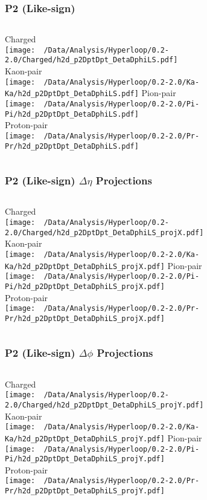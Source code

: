 \documentclass{beamer}
\begin{document}
\begin{frame}
	\frametitle{P2 (Like-sign)}
	\begin{columns}
		\centering
		Charged\\
		\texttt{[image: ~/Data/Analysis/Hyperloop/0.2-2.0/Charged/h2d\_p2DptDpt\_DetaDphiLS.pdf]}\\Kaon-pair\\
		\texttt{[image: ~/Data/Analysis/Hyperloop/0.2-2.0/Ka-Ka/h2d\_p2DptDpt\_DetaDphiLS.pdf]}
		\centering
		Pion-pair\\
		\texttt{[image: ~/Data/Analysis/Hyperloop/0.2-2.0/Pi-Pi/h2d\_p2DptDpt\_DetaDphiLS.pdf]}\\Proton-pair\\
		\texttt{[image: ~/Data/Analysis/Hyperloop/0.2-2.0/Pr-Pr/h2d\_p2DptDpt\_DetaDphiLS.pdf]}
	\end{columns}
\end{frame}
\begin{frame}
	\frametitle{P2 (Like-sign) $\Delta\eta$ Projections}
	\begin{columns}
		\column{0.5\textwidth}
		\centering
		Charged\\
		\texttt{[image: ~/Data/Analysis/Hyperloop/0.2-2.0/Charged/h2d\_p2DptDpt\_DetaDphiLS\_projX.pdf]}\\Kaon-pair\\
		\texttt{[image: ~/Data/Analysis/Hyperloop/0.2-2.0/Ka-Ka/h2d\_p2DptDpt\_DetaDphiLS\_projX.pdf]}
		\column{0.5\textwidth}
		\centering
		Pion-pair\\
		\texttt{[image: ~/Data/Analysis/Hyperloop/0.2-2.0/Pi-Pi/h2d\_p2DptDpt\_DetaDphiLS\_projX.pdf]}\\Proton-pair\\
		\texttt{[image: ~/Data/Analysis/Hyperloop/0.2-2.0/Pr-Pr/h2d\_p2DptDpt\_DetaDphiLS\_projX.pdf]}
	\end{columns}
\end{frame}
\begin{frame}
	\frametitle{P2 (Like-sign) $\Delta\phi$ Projections}
	\begin{columns}
		\centering
		Charged\\
		\texttt{[image: ~/Data/Analysis/Hyperloop/0.2-2.0/Charged/h2d\_p2DptDpt\_DetaDphiLS\_projY.pdf]}\\Kaon-pair\\
		\texttt{[image: ~/Data/Analysis/Hyperloop/0.2-2.0/Ka-Ka/h2d\_p2DptDpt\_DetaDphiLS\_projY.pdf]}
		\centering
		Pion-pair\\
		\texttt{[image: ~/Data/Analysis/Hyperloop/0.2-2.0/Pi-Pi/h2d\_p2DptDpt\_DetaDphiLS\_projY.pdf]}\\Proton-pair\\
		\texttt{[image: ~/Data/Analysis/Hyperloop/0.2-2.0/Pr-Pr/h2d\_p2DptDpt\_DetaDphiLS\_projY.pdf]}
	\end{columns}
\end{frame}
\end{document}
